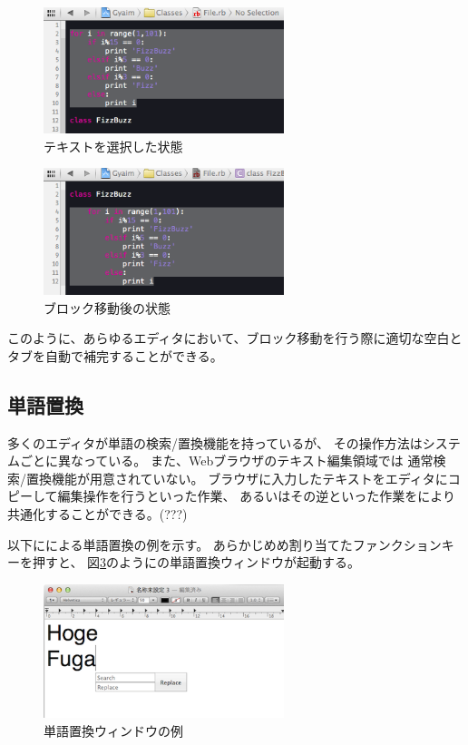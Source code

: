 \begin{figure}[H]
\centerline{\includegraphics[width=70mm,bb=0 0 360 190]{figures/indent2.png}}
\caption{テキストを選択した状態}
\label{indent2}
\end{figure}

\begin{figure}[H]
\centerline{\includegraphics[width=70mm,bb=0 0 360 190]{figures/indent3.png}}
\caption{ブロック移動後の状態}
\label{indent3}
\end{figure}

このように、あらゆるエディタにおいて、ブロック移動を行う際に適切な空白とタブを自動で補完することができる。

\subsection{単語置換}

多くのエディタが単語の検索/置換機能を持っているが、
その操作方法はシステムごとに異なっている。
また、Webブラウザのテキスト編集領域では
通常検索/置換機能が用意されていない。
ブラウザに入力したテキストをエディタにコピーして編集操作を行うといった作業、
あるいはその逆といった作業を{\system}により共通化することができる。(???)

以下に{\system}による単語置換の例を示す。
あらかじめめ割り当てたファンクションキーを押すと、
図\ref{search1}のように{\system}の単語置換ウィンドウが起動する。

\begin{figure}[H]
\centerline{\includegraphics[width=70mm,bb=0 0 360 215]{figures/replace1.png}}
\caption{単語置換ウィンドウの例}
\label{search1}
\end{figure}

